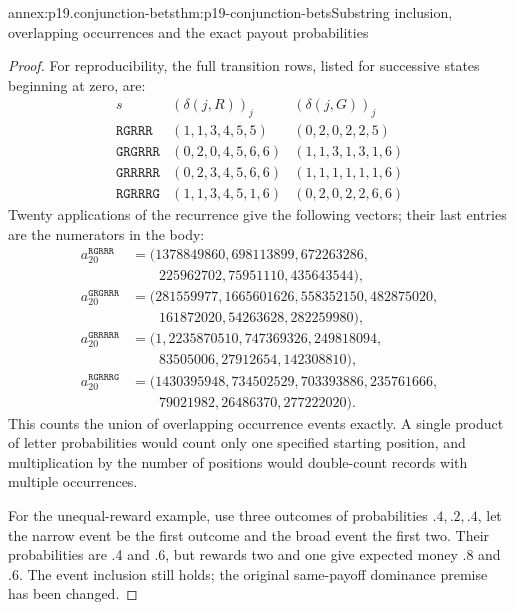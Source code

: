 \begin{annexitem}{annex:p19.conjunction-bets}{thm:p19-conjunction-bets}{Substring inclusion, overlapping occurrences and the exact payout probabilities}
\begin{proof}
For reproducibility, the full transition rows,
listed for successive states beginning at zero,
are:
\[
\begin{array}{c|l|l}
s&(\delta(j,R))_j&(\delta(j,G))_j\\ \hline
\texttt{RGRRR}&(1,1,3,4,5,5)&(0,2,0,2,2,5)\\
\texttt{GRGRRR}&(0,2,0,4,5,6,6)&(1,1,3,1,3,1,6)\\
\texttt{GRRRRR}&(0,2,3,4,5,6,6)&(1,1,1,1,1,1,6)\\
\texttt{RGRRRG}&(1,1,3,4,5,1,6)&(0,2,0,2,2,6,6)
\end{array}
\]
Twenty applications of the recurrence give
the following vectors; their last entries are
the numerators in the body:
\[
\begin{aligned}
a_{20}^{\texttt{RGRRR}}
 &= (1378849860,698113899,672263286,\\
 &\qquad225962702,75951110,435643544),\\
a_{20}^{\texttt{GRGRRR}}
 &= (281559977,1665601626,558352150,482875020,\\
 &\qquad161872020,54263628,282259980),\\
a_{20}^{\texttt{GRRRRR}}
 &= (1,2235870510,747369326,249818094,\\
 &\qquad83505006,27912654,142308810),\\
a_{20}^{\texttt{RGRRRG}}
 &= (1430395948,734502529,703393886,235761666,\\
 &\qquad79021982,26486370,277222020).
\end{aligned}
\]
This counts the union of overlapping occurrence
events exactly. A single product of letter
probabilities would count only one specified
starting position, and multiplication by the
number of positions would double-count records
with multiple occurrences.

For the unequal-reward example, use three
outcomes of probabilities \(.4,.2,.4\), let
the narrow event be the first outcome and
the broad event the first two. Their probabilities
are .4 and .6, but rewards two and one give
expected money .8 and .6. The event inclusion
still holds; the original same-payoff dominance
premise has been changed.
\end{proof}
\end{annexitem}

